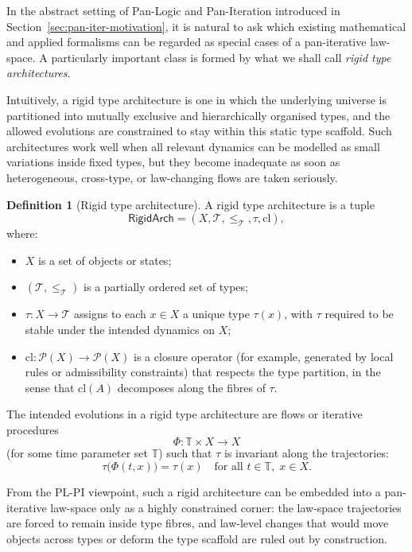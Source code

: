 \documentclass[11pt]{book}
\theoremstyle{plain}
\theoremstyle{definition}
\newtheorem{definition}[theorem]{Definition} \theoremstyle{remark}
\begin{document}
In the abstract setting of Pan-Logic and Pan-Iteration introduced in
Section~\ref{sec:pan-iter-motivation}, it is natural to ask which
existing mathematical and applied formalisms can be regarded as
special cases of a pan-iterative law-space. A particularly important
class is formed by what we shall call \emph{rigid type architectures}.

Intuitively, a rigid type architecture is one in which the underlying
universe is partitioned into mutually exclusive and hierarchically
organised types, and the allowed evolutions are constrained to stay
within this static type scaffold. Such architectures work well when
all relevant dynamics can be modelled as small variations inside fixed
types, but they become inadequate as soon as heterogeneous,
cross-type, or law-changing flows are taken seriously.

\begin{definition}[Rigid type architecture]
A rigid type architecture is a tuple
\[
  \mathsf{RigidArch}
  = (X,\mathcal{T},\leq_{\mathcal{T}},\tau,\mathrm{cl}),
\]
where:
\begin{itemize}
  \item $X$ is a set of objects or states;
  \item $(\mathcal{T},\leq_{\mathcal{T}})$ is a partially ordered set
    of types;
  \item $\tau:X\to\mathcal{T}$ assigns to each $x\in X$ a unique type
    $\tau(x)$, with $\tau$ required to be stable under the intended
    dynamics on $X$;
  \item $\mathrm{cl}:\mathcal{P}(X)\to\mathcal{P}(X)$ is a closure
    operator (for example, generated by local rules or admissibility
    constraints) that respects the type partition, in the sense that
    $\mathrm{cl}(A)$ decomposes along the fibres of $\tau$.
\end{itemize}
The intended evolutions in a rigid type architecture are flows or
iterative procedures
\[
  \Phi:\mathbb{T}\times X\to X
\]
(for some time parameter set $\mathbb{T}$) such that $\tau$ is
invariant along the trajectories:
\[
  \tau\big(\Phi(t,x)\big)=\tau(x)
  \quad\text{for all } t\in\mathbb{T},\;x\in X.
\]
\end{definition}



From the PL-PI viewpoint, such a rigid architecture can be embedded
into a pan-iterative law-space only as a highly constrained corner:
the law-space trajectories are forced to remain inside type fibres,
and law-level changes that would move objects across types or deform
the type scaffold are ruled out by construction.
\end{document}
